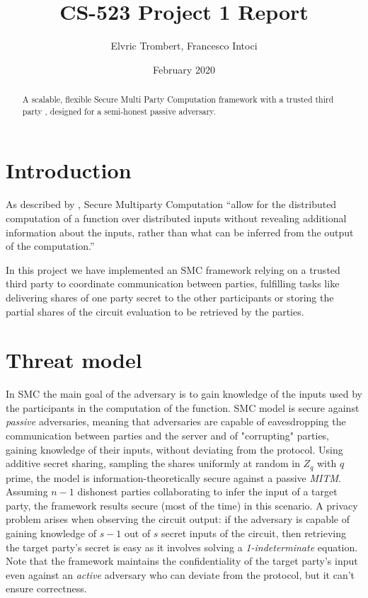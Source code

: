\documentclass[10pt,conference,compsocconf]{IEEEtran}
\title{CS-523 Project 1 Report}
\author{Elvric Trombert, Francesco Intoci}
\date{February 2020}
\begin{document}
\maketitle

\begin{abstract}
    A scalable, flexible Secure Multi Party Computation framework with a trusted third party , designed for a semi-honest passive adversary.
\end{abstract}

\section{Introduction}
As described by \cite[Frikken]{Frikken2011}, Secure Multiparty Computation \enquote{allow for the distributed computation of a
function over distributed inputs without revealing additional information about the inputs, rather than what can be inferred from the output of the computation.}

In this project we have implemented an SMC framework relying on a trusted third party to coordinate communication between
parties, fulfilling tasks like delivering shares of one party secret to the other participants or storing the partial shares
of the circuit evaluation to be retrieved by the parties.

\section{Threat model}
In SMC the main goal of the adversary is to gain knowledge of the inputs used by the participants in the computation of
the function.
SMC model is secure against \textit{passive} adversaries, meaning that adversaries are capable of eavesdropping
the communication between parties and the server and of "corrupting" parties, gaining knowledge of their inputs, without deviating from the protocol.
Using additive secret
sharing, sampling the shares uniformly at random in $Z_q$ with $q$ prime, the model is information-theoretically secure against a passive \textit{MITM}.
Assuming $n-1$ dishonest parties collaborating to
infer the input of a target party, the framework results secure (most of the time) in this scenario.
A privacy problem arises when observing the circuit output: if the adversary is capable of gaining knowledge of $s-1$ out of $s$ secret inputs of the circuit, then retrieving the
target party's secret is easy as it involves solving a \textit{1-indeterminate} equation.
Note that the framework maintains the confidentiality of the target party's input even against an
\textit{active} adversary who can deviate from the protocol, but it can't ensure correctness.
\end{document}
